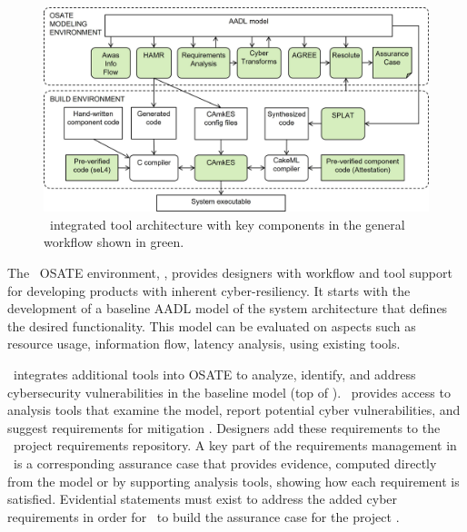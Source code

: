 \begin{figure}
	\begin{center}
	  \includegraphics[width=\textwidth]{./figs/tool-arch.jpg}
  	\end{center}
	\caption{\brfcs\ integrated tool architecture with key components in the general workflow shown in green.}
	\label{fig:tool-arch}
\end{figure}

The \brfcs\ OSATE environment, , provides
designers with workflow and tool support for developing products with
inherent cyber-resiliency.  It starts with the development of a
baseline AADL model of the system architecture that defines the
desired functionality.  This model can be evaluated on aspects such as
resource usage, information flow, latency analysis, {\etc} using
existing tools.

\brfcs\ integrates additional tools into OSATE to analyze, identify,
and address cybersecurity vulnerabilities in the baseline model (top
of ).  \brfcs\ provides access to analysis tools
that examine the model, report potential cyber vulnerabilities, and
suggest requirements for mitigation \cite{dcrypps2019,gearcase2020}.
Designers add these requirements to the \brfcs\ project requirements
repository.  A key part of the requirements management in \brfcs\ is a
corresponding assurance case that provides evidence, computed directly
from the model or by supporting analysis tools, showing how each
requirement is satisfied.  Evidential statements must exist to address
the added cyber requirements in order for \brfcs\ to build the
assurance case for the project \cite{resolute-destion}.

